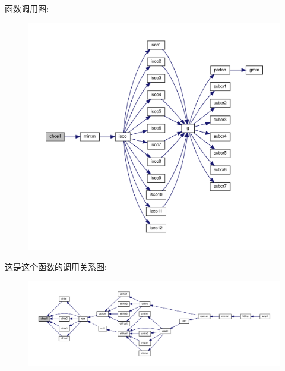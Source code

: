 函数调用图\+:
\nopagebreak
\begin{figure}[H]
\begin{center}
\leavevmode
\includegraphics[width=350pt]{chcell_8f90_a099d11a05f0ddb17b840b315048e7732_cgraph}
\end{center}
\end{figure}
这是这个函数的调用关系图\+:
\nopagebreak
\begin{figure}[H]
\begin{center}
\leavevmode
\includegraphics[width=350pt]{chcell_8f90_a099d11a05f0ddb17b840b315048e7732_icgraph}
\end{center}
\end{figure}
